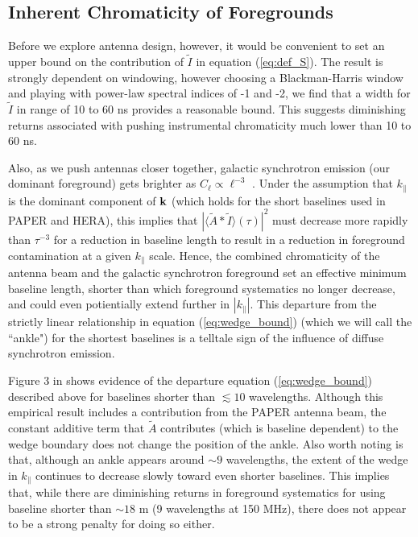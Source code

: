 \documentclass[11pt]{article}
\newcommand{\kvec}{{\bf k}}
\newcommand{\kpl}{{k_\parallel}}
\newcommand{\AI}{{\langle\tilde A*\tilde I\rangle}}
\newcommand{\AItau}{{\AI(\tau)}}
\begin{document}
\subsection{Inherent Chromaticity of Foregrounds}

Before we explore antenna design, however, it would be convenient to set an upper bound on the contribution of
$\tilde I$ in equation (\ref{eq:def_S}).   The result is strongly
dependent on windowing, however choosing a Blackman-Harris window and playing with power-law spectral indices of
-1 and -2, we find that a width for $\tilde I$ in range of 10 to 60 ns provides a reasonable bound.  This suggests diminishing returns associated with pushing instrumental chromaticity much lower than 10 to 60 ns.

Also, as we push antennas closer together, galactic synchrotron emission (our dominant foreground) gets
brighter as $C_\ell\propto\ell^{-3}$ \citep{unknown}.
Under the assumption that $\kpl$ is the dominant component of $\kvec$ (which
holds for the short baselines used in PAPER and HERA),
this implies that $|\AItau|^2$ must decrease more rapidly than $\tau^{-3}$ for a reduction in baseline length
to result in a reduction in foreground contamination at a given $\kpl$ scale.  Hence, the combined chromaticity
of the antenna beam and the galactic synchrotron foreground set an effective minimum baseline length, shorter
than which foreground systematics no longer decrease, and could even potientially extend further in $|\kpl|$.  
This departure from the
strictly linear relationship in equation (\ref{eq:wedge_bound}) (which we will call the ``ankle")
for the shortest baselines is a telltale sign
of the influence of diffuse synchrotron emission.

Figure 3 in \citet{2013ApJ...768L..36P}
shows evidence of the departure equation (\ref{eq:wedge_bound}) described above for baselines shorter than
$\lesssim10$ wavelengths.  Although this empirical result includes a contribution from the PAPER antenna beam,
the constant additive term that $\tilde A$ contributes (which is baseline dependent)
to the wedge boundary does not change the position of the ankle.  Also worth noting is that, although an ankle
appears around $\sim9$ wavelengths, the extent of the wedge in $\kpl$ continues to decrease slowly toward 
even shorter baselines.  This implies that, while there are diminishing returns in foreground systematics for using
baseline shorter than $\sim18$ m (9 wavelengths at 150 MHz), there does not appear to be a strong penalty 
for doing so either.
\end{document}
